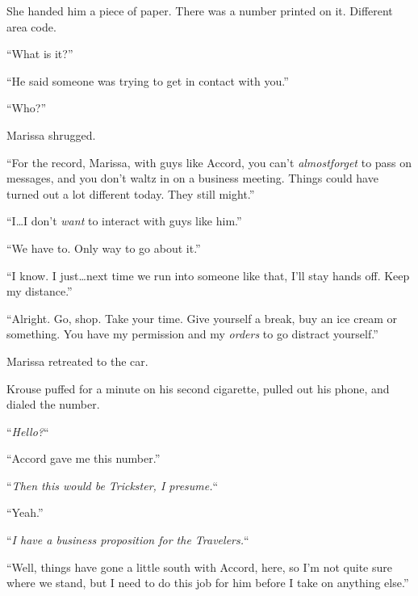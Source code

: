 She handed him a piece of paper.  There was a number printed on it.  Different area code.



``What is it?''



``He said someone was trying to get in contact with you.''



``Who?''



Marissa shrugged.



``For the record, Marissa, with guys like Accord, you can't \emph{almost}\emph{forget} to pass on messages, and you don't waltz in on a business meeting.  Things could have turned out a lot different today.  They still might.''



``I\ldots I don't \emph{want} to interact with guys like him.''



``We have to.  Only way to go about it.''



``I know.  I just\ldots next time we run into someone like that, I'll stay hands off.  Keep my distance.''



``Alright.  Go, shop.  Take your time.  Give yourself a break, buy an ice cream or something.  You have my permission and my \emph{orders} to go distract yourself.''



Marissa retreated to the car.



Krouse puffed for a minute on his second cigarette, pulled out his phone, and dialed the number.



``\emph{Hello?}``



``Accord gave me this number.''



``\emph{Then this would be Trickster, I presume.}``



``Yeah.''



``\emph{I have a business proposition for the Travelers.}``



``Well, things have gone a little south with Accord, here, so I'm not quite sure where we stand, but I need to do this job for him before I take on anything else.''



